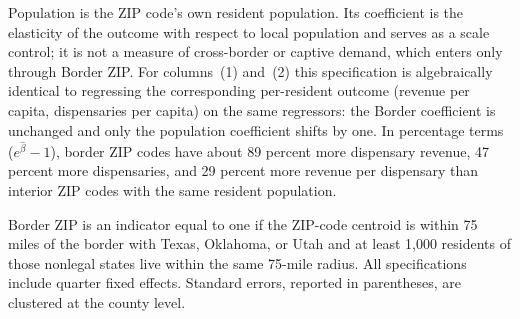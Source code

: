 \begin{table}[htbp]
\begin{minipage}{\textwidth}
$\text{Population}$ is the ZIP code's own resident population. Its coefficient is
the elasticity of the outcome with respect to local population and serves as a
scale control; it is not a measure of cross-border or captive demand, which
enters only through Border ZIP. For columns~(1) and~(2) this specification is
algebraically identical to regressing the corresponding per-resident outcome
(revenue per capita, dispensaries per capita) on the same regressors: the Border
coefficient is unchanged and only the population coefficient shifts by one. In
percentage terms ($e^{\hat\beta}-1$), border ZIP codes have about 89 percent
more dispensary revenue, 47 percent more dispensaries, and 29 percent more
revenue per dispensary than interior ZIP codes with the same resident
population.

Border ZIP is an indicator equal to one if the ZIP-code centroid is within
75 miles of the border with Texas, Oklahoma, or Utah and at least 1,000
residents of those nonlegal states live within the same 75-mile radius.
All specifications include quarter fixed effects. Standard errors, reported in
parentheses, are clustered at the county level.
\end{minipage}

\end{table}

